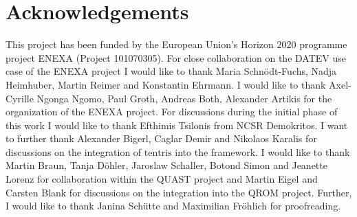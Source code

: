 \chapter{Acknowledgements}

This project has been funded by the European Union's Horizon 2020 programme project ENEXA (Project 101070305).
For close collaboration on the DATEV use case of the ENEXA project I would like to thank Maria Schnödt-Fuchs, Nadja Heimhuber, Martin Reimer and Konstantin Ehrmann.
I would like to thank Axel-Cyrille Ngonga Ngomo, Paul Groth, Andreas Both, Alexander Artikis for the organization of the ENEXA project.
For discussions during the initial phase of this work I would like to thank Efthimis Tsilonis from NCSR Demokritos.
I want to further thank Alexander Bigerl, Caglar Demir and Nikolaos Karalis for discussions on the integration of $\mathrm{tentris}$ into the \tnreason{} framework.
I would like to thank Martin Braun, Tanja Döhler, Jaroslaw Schaller, Botond Simon and Jeanette Lorenz for collaboration within the QUAST project and
Martin Eigel and Carsten Blank for discussions on the integration into the QROM project.
Further, I would like to thank Janina Schütte and Maximilian Fröhlich for proofreading.